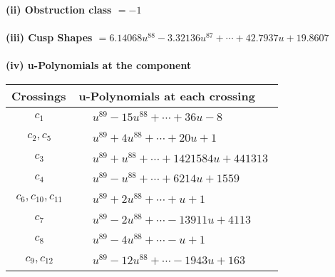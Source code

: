 \documentclass[1p]{elsarticle_modified}
\theoremstyle{definition}
\begin{document}
\flushleft \textbf{(ii) Obstruction class $= -1$}\\~\\
\flushleft \textbf{(iii) Cusp Shapes $= 6.14068 u^{88}-3.32136 u^{87}+\cdots+42.7937 u+19.8607$}\\~\\
\newpage\renewcommand{\arraystretch}{1}
\flushleft \textbf{(iv) u-Polynomials at the component}\newline \\
\begin{tabular}{m{50pt}|m{274pt}}
Crossings & \hspace{64pt}u-Polynomials at each crossing \\
\hline $$\begin{aligned}c_{1}\end{aligned}$$&$\begin{aligned}
&u^{89}-15 u^{88}+\cdots+36 u-8
\end{aligned}$\\
\hline $$\begin{aligned}c_{2},c_{5}\end{aligned}$$&$\begin{aligned}
&u^{89}+4 u^{88}+\cdots+20 u+1
\end{aligned}$\\
\hline $$\begin{aligned}c_{3}\end{aligned}$$&$\begin{aligned}
&u^{89}+u^{88}+\cdots+1421584 u+441313
\end{aligned}$\\
\hline $$\begin{aligned}c_{4}\end{aligned}$$&$\begin{aligned}
&u^{89}- u^{88}+\cdots+6214 u+1559
\end{aligned}$\\
\hline $$\begin{aligned}c_{6},c_{10},c_{11}\end{aligned}$$&$\begin{aligned}
&u^{89}+2 u^{88}+\cdots+u+1
\end{aligned}$\\
\hline $$\begin{aligned}c_{7}\end{aligned}$$&$\begin{aligned}
&u^{89}-2 u^{88}+\cdots-13911 u+4113
\end{aligned}$\\
\hline $$\begin{aligned}c_{8}\end{aligned}$$&$\begin{aligned}
&u^{89}-4 u^{88}+\cdots- u+1
\end{aligned}$\\
\hline $$\begin{aligned}c_{9},c_{12}\end{aligned}$$&$\begin{aligned}
&u^{89}-12 u^{88}+\cdots-1943 u+163
\end{aligned}$\\
\hline
\end{tabular}\\~\\
\end{document}
